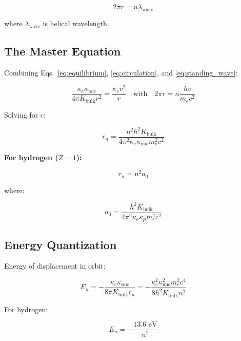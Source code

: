 \begin{equation}
2\pi r = n \lambda_{\text{wake}}
\label{eq:standing_wave}
\end{equation}

where $\lambda_{\text{wake}}$ is helical wavelength.

\subsection{The Master Equation}

Combining Eqs.~\ref{eq:equilibrium}, \ref{eq:circulation}, and \ref{eq:standing_wave}:

\begin{equation}
\boxed{\frac{\kappa_e \kappa_{\text{nuc}}}{4\pi K_{\text{bulk}} r^2} = \frac{\kappa_e v^2}{r} \quad \text{with} \quad 2\pi r = n\frac{h v}{m_e c^2}}
\label{eq:master}
\end{equation}

Solving for $r$:

\begin{equation}
r_n = \frac{n^2 h^2 K_{\text{bulk}}}{4\pi^2 \kappa_e \kappa_{\text{nuc}} m_e^2 c^2}
\end{equation}

\textbf{For hydrogen ($Z=1$):}

\begin{equation}
r_n = n^2 a_0
\end{equation}

where:

\begin{equation}
a_0 = \frac{h^2 K_{\text{bulk}}}{4\pi^2 \kappa_e \kappa_p m_e^2 c^2}
\end{equation}

\subsection{Energy Quantization}

Energy of displacement in orbit:

\begin{equation}
E_n = -\frac{\kappa_e \kappa_{\text{nuc}}}{8\pi K_{\text{bulk}} r_n} = -\frac{\kappa_e^2 \kappa_{\text{nuc}}^2 m_e^2 c^4}{8 h^2 K_{\text{bulk}} n^2}
\end{equation}

For hydrogen:

\begin{equation}
E_n = -\frac{13.6 \text{ eV}}{n^2}
\end{equation}

